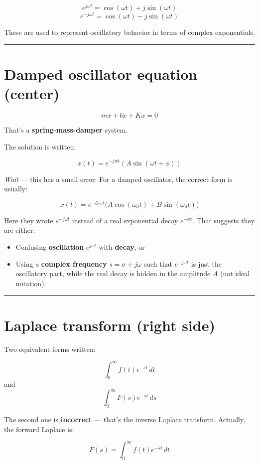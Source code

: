 \documentclass[UTF8,a4paper,11pt]{ctexart}
\begin{document}
\[
e^{j\omega t} = \cos(\omega t) + j\sin(\omega t)
\]
\[
e^{-j\omega t} = \cos(\omega t) - j\sin(\omega t)
\]

These are used to represent oscillatory behavior in terms of complex exponentials.

\bigskip\noindent\rule{\linewidth}{0.4pt}\bigskip

\section{Damped oscillator equation (center)}

\[
m\ddot{x} + b\dot{x} + Kx = 0
\]

That's a \textbf{spring-mass-damper} system.

The solution is written:

\[
x(t) = e^{-jwt} (A \sin(\omega t + \phi))
\]

\emph{Wait} --- this has a small error:
For a damped oscillator, the correct form is usually:

\[
x(t) = e^{-\zeta \omega_n t} \big(A \cos(\omega_d t) + B \sin(\omega_d t)\big)
\]

Here they wrote $e^{-j\omega t}$ instead of a real exponential decay $e^{-\sigma t}$. That suggests they are either:

\begin{itemize}
  \item Confusing \textbf{oscillation} $e^{j\omega t}$ with \textbf{decay}, or
  \item Using a \textbf{complex frequency} $s = \sigma + j\omega$ such that $e^{-j\omega t}$ is just the oscillatory part, while the real decay is hidden in the amplitude $A$ (not ideal notation).
\end{itemize}

\bigskip\noindent\rule{\linewidth}{0.4pt}\bigskip

\section{Laplace transform (right side)}

Two equivalent forms written:

\[
\int_{0}^{\infty} f(t) e^{-st} \, dt
\]
and
\[
\int_{0}^{\infty} F(s) e^{-st} \, ds
\]

The second one is \textbf{incorrect} --- that's the inverse Laplace transform.
Actually, the forward Laplace is:

\[
F(s) = \int_{0}^{\infty} f(t) e^{-st} \, dt
\]
\end{document}

